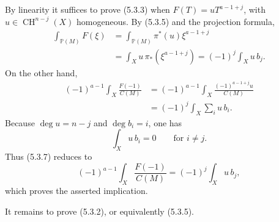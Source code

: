 By linearity it suffices to prove (5.3.3) when
$F(T)=uT^{a-1+j}$, with $u\in\operatorname{CH}^{n-j}(X)$
homogeneous.  By (5.3.5) and the projection formula,
\begin{equation}\tag{5.3.6}
\begin{aligned}
\int_{\mathbb P(M)}F(\xi)
&=\int_{\mathbb P(M)}\pi^*(u)\xi^{a-1+j}\\
&=\int_Xu\,\pi_*(\xi^{a-1+j})
=(-1)^j\int_Xu\,b_j.
\end{aligned}
\end{equation}
On the other hand,
\begin{equation}\tag*{5.3.7.}
\begin{aligned}
(-1)^{a-1}\int_X\frac{F(-1)}{C(M)}
&=(-1)^{a-1}\int_X
  \frac{(-1)^{a-1+j}u}{C(M)}\\
&=(-1)^j\int_X\sum_i u\,b_i.
\end{aligned}
\end{equation}
Because $\deg u=n-j$ and $\deg b_i=i$, one has
\[
\int_Xu\,b_i=0\qquad\text{for }i\ne j.
\]
Thus (5.3.7) reduces to
\begin{equation}\tag{5.3.8}
(-1)^{a-1}\int_X\frac{F(-1)}{C(M)}
=(-1)^j\int_Xu\,b_j,
\end{equation}
which proves the asserted implication.

It remains to prove (5.3.2), or equivalently (5.3.5).

